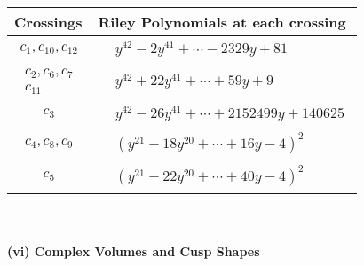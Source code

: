 \documentclass[1p]{elsarticle_modified}
\theoremstyle{definition}
\begin{document}
\begin{tabular}{m{50pt}|m{274pt}}
Crossings & \hspace{64pt}Riley Polynomials at each crossing \\
\hline $$\begin{aligned}c_{1},c_{10},c_{12}\end{aligned}$$&$\begin{aligned}
&y^{42}-2 y^{41}+\cdots-2329 y+81
\end{aligned}$\\
\hline $$\begin{aligned}c_{2},c_{6},c_{7}\\c_{11}\end{aligned}$$&$\begin{aligned}
&y^{42}+22 y^{41}+\cdots+59 y+9
\end{aligned}$\\
\hline $$\begin{aligned}c_{3}\end{aligned}$$&$\begin{aligned}
&y^{42}-26 y^{41}+\cdots+2152499 y+140625
\end{aligned}$\\
\hline $$\begin{aligned}c_{4},c_{8},c_{9}\end{aligned}$$&$\begin{aligned}
&(y^{21}+18 y^{20}+\cdots+16 y-4)^{2}
\end{aligned}$\\
\hline $$\begin{aligned}c_{5}\end{aligned}$$&$\begin{aligned}
&(y^{21}-22 y^{20}+\cdots+40 y-4)^{2}
\end{aligned}$\\
\hline
\end{tabular}\\~\\
\newpage\flushleft \textbf{(vi) Complex Volumes and Cusp Shapes}
\end{document}
